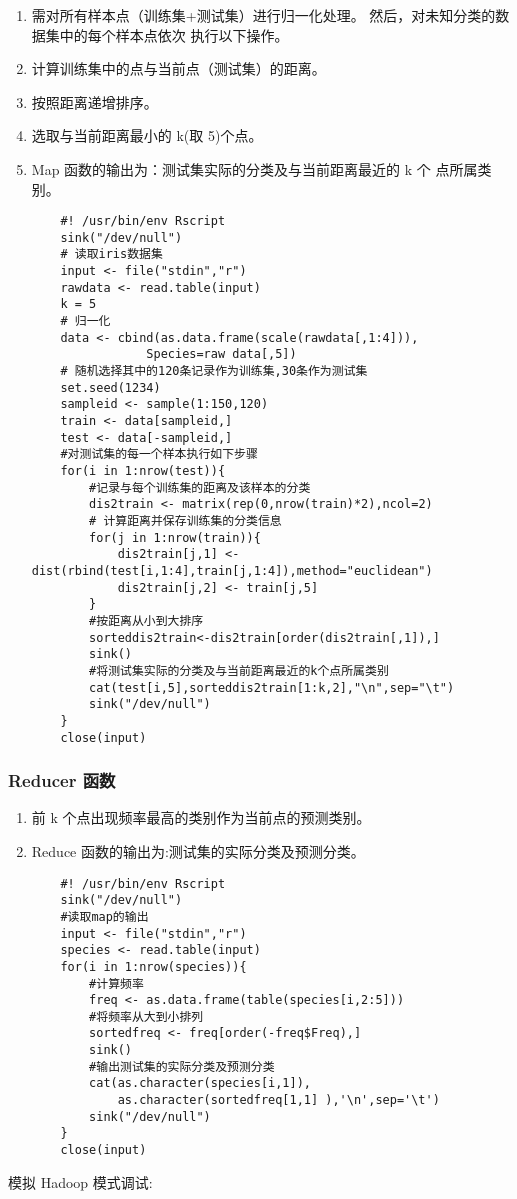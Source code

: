 \begin{enumerate}
\def\labelenumi{\arabic{enumi}.}
\item
  需对所有样本点（训练集+测试集）进行归一化处理。
  然后，对未知分类的数据集中的每个样本点依次 执行以下操作。
\item
  计算训练集中的点与当前点（测试集）的距离。
\item
  按照距离递增排序。
\item
  选取与当前距离最小的 k(取 5)个点。
\item
  Map 函数的输出为：测试集实际的分类及与当前距离最近的 k 个 点所属类别。

\begin{lstlisting}
	#! /usr/bin/env Rscript
	sink("/dev/null")
	# 读取iris数据集
	input <- file("stdin","r")
	rawdata <- read.table(input)
	k = 5
	# 归一化
	data <- cbind(as.data.frame(scale(rawdata[,1:4])),
	            Species=raw data[,5])
	# 随机选择其中的120条记录作为训练集,30条作为测试集
	set.seed(1234)
	sampleid <- sample(1:150,120)
	train <- data[sampleid,]
	test <- data[-sampleid,]
	#对测试集的每一个样本执行如下步骤
	for(i in 1:nrow(test)){
	    #记录与每个训练集的距离及该样本的分类
	    dis2train <- matrix(rep(0,nrow(train)*2),ncol=2)
	    # 计算距离并保存训练集的分类信息
	    for(j in 1:nrow(train)){
	        dis2train[j,1] <- dist(rbind(test[i,1:4],train[j,1:4]),method="euclidean")
	        dis2train[j,2] <- train[j,5]
	    }
	    #按距离从小到大排序
	    sorteddis2train<-dis2train[order(dis2train[,1]),]
	    sink()
	    #将测试集实际的分类及与当前距离最近的k个点所属类别
	    cat(test[i,5],sorteddis2train[1:k,2],"\n",sep="\t")
	    sink("/dev/null")
	}
	close(input)
\end{lstlisting}
\end{enumerate}

\subsubsection{Reducer 函数}\label{reducer-ux51fdux6570}

\begin{enumerate}
\def\labelenumi{\arabic{enumi}.}
\item
  前 k 个点出现频率最高的类别作为当前点的预测类别。
\item
  Reduce 函数的输出为:测试集的实际分类及预测分类。

\begin{lstlisting}
	#! /usr/bin/env Rscript
	sink("/dev/null")
	#读取map的输出
	input <- file("stdin","r")
	species <- read.table(input)
	for(i in 1:nrow(species)){
	    #计算频率
	    freq <- as.data.frame(table(species[i,2:5]))
	    #将频率从大到小排列
	    sortedfreq <- freq[order(-freq$Freq),]
	    sink()
	    #输出测试集的实际分类及预测分类
	    cat(as.character(species[i,1]),
	        as.character(sortedfreq[1,1] ),'\n',sep='\t')
	    sink("/dev/null")
	}
	close(input)
\end{lstlisting}
\end{enumerate}
模拟 Hadoop 模式调试:

